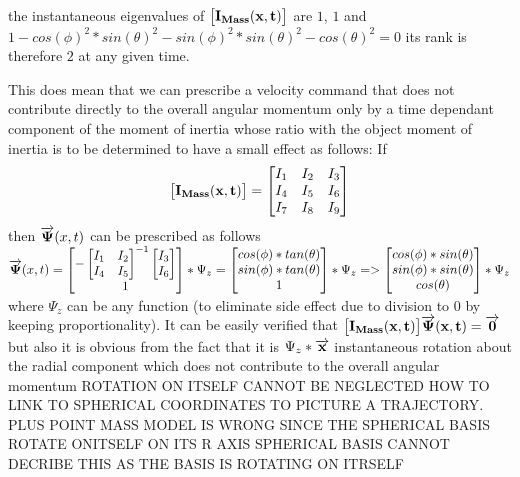 the instantaneous eigenvalues of $\big[ \bf {I_{Mass}(x,t)} \big]$ are $1$, $1$ and $1 - cos(\phi)^2*sin(\theta)^2 - sin(\phi)^2*sin(\theta)^2 - cos(\theta)^2=0$ its rank is therefore $2$ at any given time.

This does mean that we can prescribe a velocity command that does not contribute directly to the overall angular momentum only by a time dependant component of the moment of inertia whose ratio with the object moment of inertia is to be determined to have a small effect as follows:
If $$\big[ \bf {I_{Mass}(x,t)} \big]=\begin{bmatrix}
	I_{1} & I_{2} & I_{3} \\ I_{4} & I_{5} & I_{6} \\ I_{7} & I_{8} & I_{9}
\end{bmatrix}$$
then $\overrightarrow{\bf \Psi}(x,t)$ can be prescribed as follows
$\overrightarrow{\bf \Psi}(x,t)=\begin{bmatrix}
-\begin{bmatrix}I_{1} & I_{2}  \\ I_{4} & I_{5}\end{bmatrix}^{-1} \begin{bmatrix} I_{3}\\ I_{6}\end{bmatrix}  \\ 1
\end{bmatrix}*\Psi_z=\begin{bmatrix}
cos(\phi)*tan(\theta) \\
sin(\phi)*tan(\theta) \\ 1 \end{bmatrix}*\Psi_z=>\begin{bmatrix}
cos(\phi)*sin(\theta) \\sin(\phi)*sin(\theta) \\ cos(\theta) \end{bmatrix}*\Psi_z$ where $\Psi_z$ can be any function (to eliminate side effect due to division to 0 by keeping proportionality). It can be easily verified that
$\big [\bf I_{Mass}(x,t)\big]\overrightarrow{\bf \Psi}(x,t)=\overrightarrow{\bf 0}$ but also it is obvious from the fact that it is $\Psi_z*\overrightarrow{\bf x}$ instantaneous rotation about the radial component which does not contribute to the overall angular momentum ROTATION ON ITSELF CANNOT BE NEGLECTED HOW TO LINK TO SPHERICAL COORDINATES TO PICTURE A TRAJECTORY. PLUS POINT MASS MODEL IS WRONG SINCE THE SPHERICAL BASIS ROTATE ONITSELF ON ITS R AXIS SPHERICAL BASIS CANNOT DECRIBE THIS AS THE BASIS IS ROTATING ON ITRSELF

